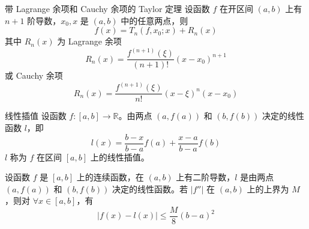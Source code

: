 \begin{theorem}{带 Lagrange 余项和 Cauchy 余项的 Taylor 定理}
  设函数 $f$ 在开区间 $(a,b)$ 上有 $n + 1$ 阶导数，$x_0,x$ 是 $(a,b)$ 中的任意两点，则
  \[f(x) = T_n(f,x_0;x) + R_n(x)\]
  其中 $R_n(x)$ 为 Lagrange 余项
  \[R_n(x) = \frac{f^{(n + 1)}(\xi)}{(n + 1)!}(x - x_0)^{n + 1}\]
  或 Cauchy 余项
  \[R_n(x) = \frac{f^{(n + 1)}(\xi)}{n!}(x - \xi)^n(x - x_0)\]
\end{theorem}

\begin{definition}{线性插值}
  设函数 $f:[a,b] \to \mathbb{R}$。由两点 $(a,f(a))$ 和 $(b,f(b))$ 决定的线性函数 $l$，即
  \[l(x) = \frac{b - x}{b -a}f(a) + \frac{x - a}{b - a}f(b)\]
  $l$ 称为 $f$ 在区间 $[a,b]$ 上的线性插值。
\end{definition}

\begin{theorem}
  设函数 $f$ 是 $[a,b]$ 上的连续函数，在 $(a,b)$ 上有二阶导数，$l$ 是由两点 $(a,f(a))$ 和 $(b,f(b))$ 决定的线性函数。若 $|f''|$ 在 $(a,b)$ 上的上界为 $M$，则对 $\forall x \in [a,b]$，有
  \[|f(x) - l(x)| \leqslant \frac{M}{8}(b - a)^2\]
\end{theorem}

